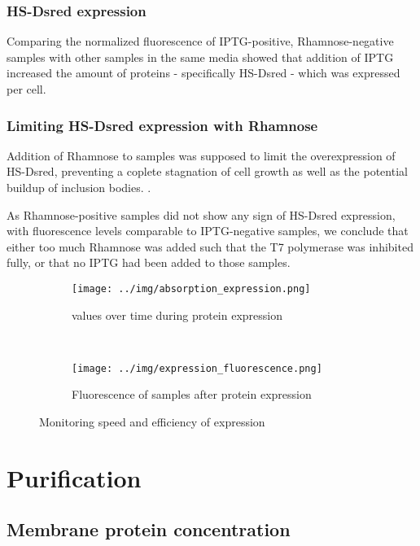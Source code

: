 \subsubsection{HS-Dsred expression}

Comparing the normalized fluorescence of IPTG-positive, Rhamnose-negative
samples with other samples in the same media showed that addition of IPTG
increased the amount of proteins - specifically HS-Dsred - which was expressed
per cell.

\subsubsection{Limiting HS-Dsred expression with Rhamnose}

Addition of Rhamnose to samples was supposed to limit the overexpression of
HS-Dsred, preventing a coplete stagnation of cell growth as well as the
potential buildup of inclusion bodies. \cite{memstar}.

As Rhamnose-positive samples did not show any sign of HS-Dsred expression, with
fluorescence levels comparable to IPTG-negative samples, we conclude that
either too much Rhamnose was added such that the T7 polymerase was inhibited
fully, or that no IPTG had been added to those samples.


\begin{figure*}
	\centering
	\begin{subfigure}{0.45\textwidth}
		\texttt{[image: ../img/absorption\_expression.png]}
		\caption{\odbact values over time during protein expression}
		\label{fig:absorption_expression}
	\end{subfigure}
	~
	\begin{subfigure}{0.45\textwidth}
		\centering
		\texttt{[image: ../img/expression\_fluorescence.png]}
		\caption{Fluorescence of samples after protein expression}
		\label{fig:fluorescence_expression}
	\end{subfigure}

	\caption{Monitoring speed and efficiency of expression}
	\label{fig:expression}
\end{figure*}

\section{Purification}

\subsection{Membrane protein concentration}

